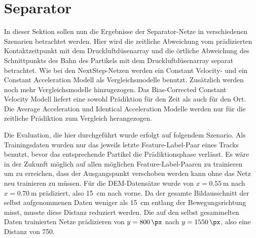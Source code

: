 


\section{Separator}





In dieser Sektion sollen nun die Ergebnisse der Separator-Netze in verschiedenen Szenarien betrachtet werden.
Hier wird  die zeitliche Abweichung vom prädizierten Kontaktzeitpunkt mit dem Druckluftdüsenarray und die örtliche Abweichung des Schnittpunkts des Bahn des Partikels mit dem Druckluftdüsenarray separat betrachtet.
Wie bei den NextStep-Netzen werden ein Constant Velocity- und ein Constant Acceleration Modell 
als Vergleichsmodelle benutzt. 
Zusätzlich werden noch mehr Vergleichsmodelle hinzugezogen. 
Das Bias-Corrected Constant Velocity Modell liefert eine sowohl Prädiktion für den Zeit als auch für den Ort.
Die Average Acceleration und Identical Acceleration Modelle werden nur für die zeitliche Prädiktion zum Vergleich herangezogen.

Die Evaluation, die hier durchgeführt wurde erfolgt auf folgendem Szenario.
Als Trainingsdaten wurden nur das jeweils letzte Feature-Label-Paar eines Tracks benutzt, bevor das entsprechende Partikel die Prädiktionsphase verlässt.
Es wäre in der Zukunft möglich auf allen möglichen Feature-Label-Paaren zu trainieren um zu erreichen, dass der Ausgangspunkt verschoben werden kann ohne das Netz neu trainieren zu müssen.
Für die DEM-Datensätze wurde von \(x = \SI{0.55}{\meter}\) nach \(x = \SI{0.70}{\meter}\) prädiziert, also \SI{15}{\centi\meter} nach vorne.
Da der gesamte Bildausschnitt der selbst aufgenommenen Daten weniger als \SI{15}{\centi\meter} entlang der Bewegungsrichtung misst, musste diese Distanz reduziert werden.
Die auf den selbst gesammelten Daten trainierten Netze prädizieren von \(y = \SI{800}{\px}\) nach \(y = \SI{1550}{\px}\), also eine Distanz von \SI{750}{\px}.


